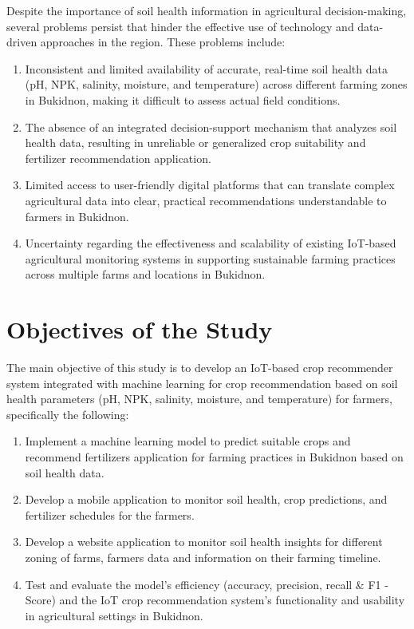 {	Despite the importance of soil health information in agricultural decision-making, several problems persist that hinder the effective use of technology and data-driven approaches in the region. These problems include:
	
	
	\begin{enumerate}
		\item Inconsistent and limited availability of accurate, real-time soil health data (pH, NPK, salinity, moisture, and temperature) across different farming zones in Bukidnon, making it difficult to assess actual field conditions.
		\item The absence of an integrated decision-support mechanism that analyzes soil health data, resulting in unreliable or generalized crop suitability and fertilizer recommendation application.
		\item Limited access to user-friendly digital platforms that can translate complex agricultural data into clear, practical recommendations understandable to farmers in Bukidnon.
		\item Uncertainty regarding the effectiveness and scalability of existing IoT-based agricultural monitoring systems in supporting sustainable farming practices across multiple farms and locations in Bukidnon.
	\end{enumerate}
	
	\section{Objectives of the Study}
	
	The main objective of this study is to develop an IoT-based crop recommender system integrated with machine learning for crop recommendation based on soil health parameters (pH, NPK, salinity, moisture, and temperature) for farmers, specifically the following:
	
	\begin{enumerate}
		\item Implement a machine learning model to predict suitable crops and recommend fertilizers application for farming practices in Bukidnon based on soil health data.
		\item Develop a mobile application to monitor soil health, crop predictions, and fertilizer schedules for the farmers.
		\item Develop a website application to monitor soil health insights for different zoning of farms, farmers data and information on their farming timeline.
		\item Test and evaluate the model's efficiency (accuracy, precision, recall \& F1 - Score) and the IoT crop recommendation system's functionality and usability in agricultural settings in Bukidnon.
	\end{enumerate}
	
}
